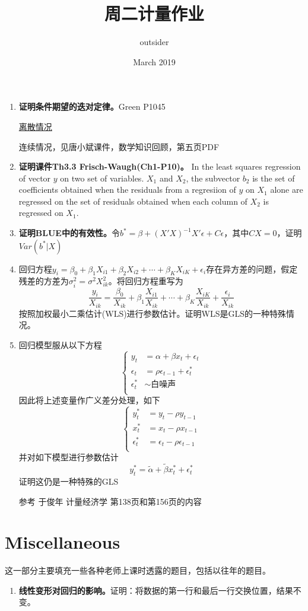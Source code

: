 \documentclass{article}
\title{周二计量作业}
\author{outsider}
\date{March 2019}
\begin{document}
\maketitle

\begin{enumerate}
    \item \textbf{证明条件期望的迭对定律。}Green P1045
    
    \href{https://en.wikipedia.org/wiki/Law_of_total_expectation}{离散情况}
    
    连续情况，见唐小斌课件，数学知识回顾，第五页PDF
    
    \item \textbf{证明课件Th3.3 Frisch-Waugh(Ch1-P10)。} In the least squares regression of vector $y$ on two set of variables. $X_1$ and $X_2$, the subvector $b_2$ is the set of coefficients obtained when the residuals from a regresiion of $y$ on $X_1$ alone are regressed on the set of residuals obtained when each column of $X_2$ is regressed on $X_1$.
    
    \item \textbf{证明BLUE中的有效性。}令$b^{*}=\beta+(X'X)^{-1}X'\epsilon+C\epsilon$，其中$CX=0$，证明$Var(b^*|X)$
    
    \item 回归方程$y_i=\beta_0+\beta_1X_{i1}+\beta_2X_{i2}+\cdots+\beta_KX_{iK}+\epsilon_i$存在异方差的问题，假定残差的方差为$\sigma_i^2=\sigma^2X_{ik}^2$。将回归方程重写为
    $$
      \frac{y_i}{X_{ik}}=\frac{\beta_0}{X_{ik}}+\beta_1\frac{X_{i1}}{X_{ik}}+\cdots+\beta_K\frac{X_{iK}}{X_{ik}}+\frac{\epsilon_i}{X_{ik}}
    $$
    按照加权最小二乘估计(WLS)进行参数估计。证明WLS是GLS的一种特殊情况。
    
    \item 回归模型服从以下方程
    $$
    \left\{
      \begin{aligned}
        y_t&=\alpha+\beta x_t+\epsilon_t \\
        \epsilon_t&=\rho \epsilon_{t-1}+\epsilon_t^{*} \\
        \epsilon_t^{*} &\sim \text{白噪声}\\
      \end{aligned}
    \right.
    $$
    因此将上述变量作广义差分处理，如下
    $$
    \left\{
      \begin{aligned}
        y_t^* &= y_t-\rho y_{t-1} \\
        x_t^* &= x_t-\rho x_{t-1}  \\
        \epsilon_t^* &= \epsilon_t-\rho \epsilon_{t-1} \\
      \end{aligned}
    \right.
    $$
    并对如下模型进行参数估计
    $$
      y_t^* = \widetilde{\alpha}+\widetilde{\beta}x_t^*+\epsilon_t^*
    $$
    证明这仍是一种特殊的GLS
    
    参考 于俊年 计量经济学 第138页和第156页的内容
\end{enumerate}

\section*{Miscellaneous}

这一部分主要填充一些各种老师上课时透露的题目，包括以往年的题目。

\begin{enumerate}
    \item \textbf{线性变形对回归的影响。}证明：将数据的第一行和最后一行交换位置，结果不变。
\end{enumerate}
\end{document}
